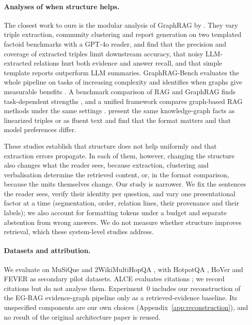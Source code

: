 \paragraph{Analyses of when structure helps.}
The closest work to ours is the modular analysis of GraphRAG by \citet{nishida-etal-2026-dissecting}. They vary triple extraction, community clustering and report generation on two templated factoid benchmarks with a GPT-4o reader, and find that the precision and coverage of extracted triples limit downstream accuracy, that noisy LLM-extracted relations hurt both evidence and answer recall, and that simple template reports outperform LLM summaries. GraphRAG-Bench evaluates the whole pipeline on tasks of increasing complexity and identifies when graphs give measurable benefits \citep{xiang2026whentographs}. A benchmark comparison of RAG and GraphRAG finds task-dependent strengths \citep{han2025ragvsgraphrag}, and a unified framework compares graph-based RAG methods under the same settings \citep{zhou2025indepth}. \citet{dai2024llmkg} present the same knowledge-graph facts as linearized triples or as fluent text and find that the format matters and that model preferences differ.

These studies establish that structure does not help uniformly and that extraction errors propagate. In each of them, however, changing the structure also changes what the reader sees, because extraction, clustering and verbalisation determine the retrieved content, or, in the format comparison, because the units themselves change. Our study is narrower. We fix the sentences the reader sees, verify their identity per question, and vary one presentational factor at a time (segmentation, order, relation lines, their provenance and their labels); we also account for formatting tokens under a budget and separate abstention from wrong answers. We do not measure whether structure improves retrieval, which these system-level studies address.

\paragraph{Datasets and attribution.}
We evaluate on MuSiQue \citep{trivedi2022musique} and 2WikiMultiHopQA \citep{ho2020twowiki}, with HotpotQA \citep{yang2018hotpotqa}, HoVer \citep{jiang2020hover} and FEVER \citep{thorne2018fever} as secondary pilot datasets. ALCE evaluates citations \citep{gao2023alce}; we record citations but do not analyse them. Experiment~0 includes our reconstruction of the EG-RAG evidence-graph pipeline only as a retrieved-evidence baseline. Its unspecified components are our own choices (Appendix~\ref{app:reconstruction}), and no result of the original architecture paper is reused.

